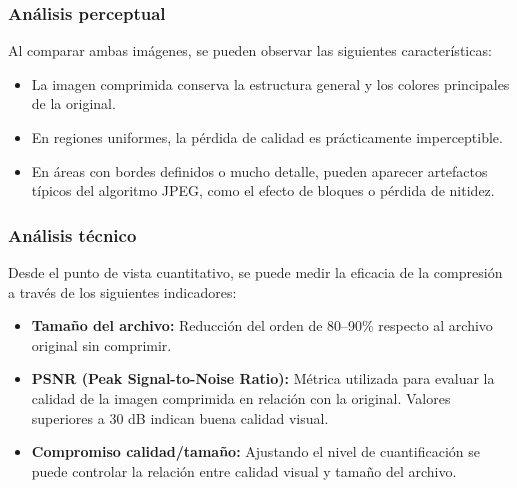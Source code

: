 \documentclass[8pt,a4paper]{article}
\theoremstyle{definition}
\theoremstyle{remark}
\begin{document}
\begin{multicols}{2}
%
%     

        
            \subsubsection{Análisis perceptual}
            Al comparar ambas imágenes, se pueden observar las siguientes características:
            \begin{itemize}
            \item La imagen comprimida conserva la estructura general y los colores principales de la original.
            \item En regiones uniformes, la pérdida de calidad es prácticamente imperceptible.
            \item En áreas con bordes definidos o mucho detalle, pueden aparecer artefactos típicos del algoritmo JPEG, como el efecto de bloques o pérdida de nitidez.
            \end{itemize}
        
            \subsubsection{Análisis técnico}
        
            Desde el punto de vista cuantitativo, se puede medir la eficacia de la compresión a través de los siguientes indicadores:
        
            \begin{itemize}
            \item \textbf{Tamaño del archivo:} Reducción del orden de 80–90\% respecto al archivo original sin comprimir.
            \item \textbf{PSNR (Peak Signal-to-Noise Ratio):} Métrica utilizada para evaluar la calidad de la imagen comprimida en relación con la original. Valores superiores a 30 dB indican buena calidad visual.
            \item \textbf{Compromiso calidad/tamaño:} Ajustando el nivel de cuantificación se puede controlar la relación entre calidad visual y tamaño del archivo.
            \end{itemize}
        

\end{multicols}
\end{document}
